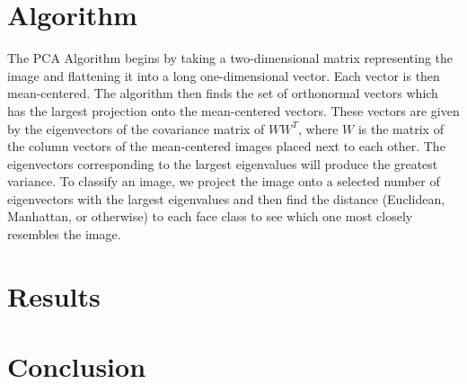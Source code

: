 \documentclass[letterpaper]{article}
\begin{document}
\section{Algorithm}
The PCA Algorithm begins by taking a two-dimensional matrix representing the image and flattening it into a long one-dimensional vector.  Each vector is then mean-centered.  The algorithm then finds the set of orthonormal vectors which has the largest projection onto the mean-centered vectors. These vectors are given by the eigenvectors of the covariance matrix of $WW^T$, where $W$ is the matrix of the column vectors of the mean-centered images placed next to each other.  The eigenvectors corresponding to the largest eigenvalues will produce the greatest variance.  To classify an image, we project the image onto a selected number of eigenvectors with the largest eigenvalues and then find the distance (Euclidean, Manhattan, or otherwise) to each face class to see which one most closely resembles the image.
\section{Results}
\section{Conclusion}
\end{document}
